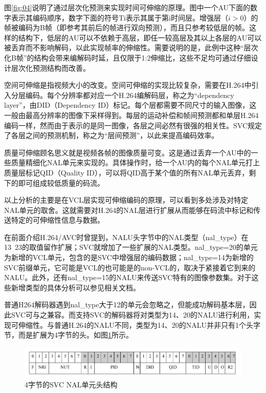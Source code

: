 图\ref{fig:04}说明了通过层次化预测来实现时间可伸缩的原理。图中一个AU下面的数字表示其编码顺序，数字下面的符号Ti表示其属于第i时间层。增强层（$i>0$）的帧被编码为B帧（即参考其前后的帧进行双向预测），而且只参考较低层的帧。这样的结构下，低层的AU可以不依赖于高层，即任一较高层及其以上各层的AU可以被丢弃而不影响解码，以此实现帧率的伸缩性。需要说明的是，此例中这种“层次化B帧”的结构会带来编解码时延，且仅限于1:2伸缩比，这些不足均可通过仔细设计层次化预测结构而改善。

空间可伸缩是指视频大小的改变。空间可伸缩的实现比较复杂，需要在H.264中引入分层编码。每个分辨率都对应一个H.264编解码层，称之为“dependency layer”，由DID（Dependency ID）标记。每个层都需要不同尺寸的输入图像，这一般由最高分辨率的图像下采样得到。每层的运动补偿和帧间预测都和单层H.264编码一样，然而由于表示的是同一图像，各层之间必然有很强的相关性。SVC规定了各层之间的预测机制，称之为“层间预测”，以此来提高编码效率。

质量可伸缩顾名思义就是视频各帧的图像质量可变。这是通过丢弃一个AU中的一些质量精细化NAL单元来实现的。具体操作时，给一个AU内的每个NAL单元打上质量层标记QID（Quality ID），可以将QID高于某个值的所有NAL单元丢弃，剩下的即可组成较低质量的码流。

以上分析的主要是在VCL层实现可伸缩编码的原理，可以看到多处涉及对特定NAL单元的取舍。这就需要对H.264的NAL层进行扩展从而能够在码流中标记和传送特定的可伸缩性信息与数据。

在前面介绍H.264/AVC时曾提到，NALU头字节中的NAL类型（nal\_type）在13~23的取值留作扩展；SVC就增加了一些扩展的NAL类型。nal\_type=20的单元为新增的VCL单元，包含的是SVC中增强层的编码数据；nal\_type=14为新增的SVC前缀单元，它可能是VCL的也可能是的non-VCL的，取决于紧接着它到来的NALU。此外，还有nal\_type=15的NALU来传送SVC特有的图像参数集。对于这些新增类型的具体分析可以参见相关文档\supercite{SVC-Interface}。

普通H264解码器遇到nal\_type大于12的单元会忽略之，但能成功解码基本层，因此SVC可与之兼容。而支持SVC的解码器将对类型为14、20的NALU进行利用，实现可伸缩性。与普通H.264的NALU不同，类型为14、20的NALU并非只有1个头字节，而是扩展为4字节的头。如图\ref{fig:05}所示。

\begin{figure}[h]
	\centering
	\includegraphics[width = 1.0\linewidth]{clip/05.png}
	\caption{4字节的SVC NAL单元头结构\label{fig:05}}
\end{figure}

